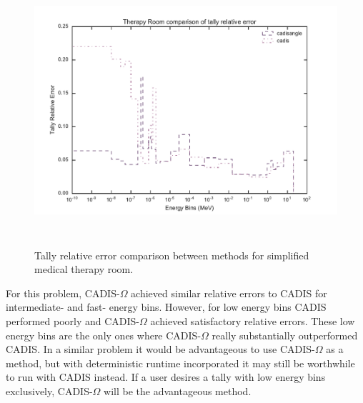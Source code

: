 \begin{figure}[h!]
  \centering
  \includegraphics[height=10cm]{./chapters/characterization_probs/figures/char/therapy/therapy_room_tally_error_compare.pdf}
  \caption[Tally relative error comparison between methods for simplified
  medical therapy room.]
  {Tally relative error comparison between methods for simplified medical
  therapy room.}
  \label{fig:therapyerror}
\end{figure}

For this problem, CADIS-$\Omega$ achieved similar relative errors to CADIS for
intermediate- and fast- energy bins. However, for low energy bins CADIS
performed poorly and CADIS-$\Omega$ achieved satisfactory relative errors. These
low energy bins are the only ones where CADIS-$\Omega$ really substantially
outperformed CADIS. In a similar problem it would be advantageous to use
CADIS-$\Omega$ as a method, but with deterministic runtime incorporated it may
still be worthwhile to run with CADIS instead. If a user desires a tally with
low energy bins exclusively, CADIS-$\Omega$ will be the advantageous method.

